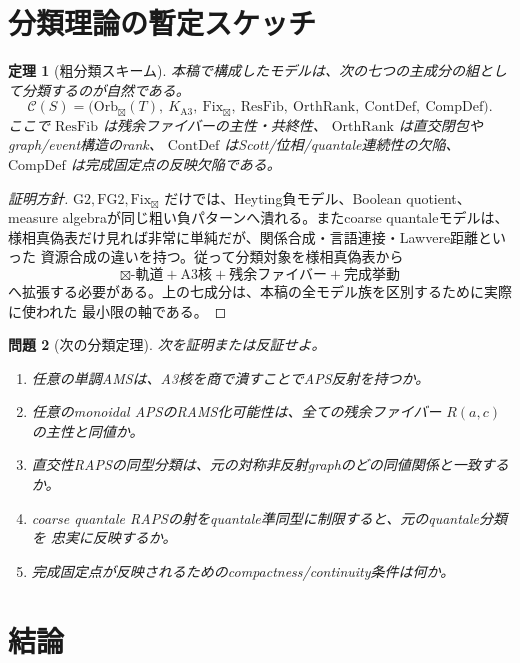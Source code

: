 \documentclass[uplatex,dvipdfmx,a4paper,10pt]{jsarticle}
\newtheorem{theorem}{定理}
\newtheorem{problem}[theorem]{問題}
\newcommand{\Gtwo}{\mathrm{G2}}
\newcommand{\FGtwo}{\mathrm{FG2}}
\newcommand{\Fix}{\mathrm{Fix}}
\newcommand{\bt}{\boxtimes}
\begin{document}
\section{分類理論の暫定スケッチ}

\begin{theorem}[粗分類スキーム]
本稿で構成したモデルは、次の七つの主成分の組として分類するのが自然である。
\[
\mathcal C(S)=
\bigl(
\mathrm{Orb}_{\bt}(T),\
K_{\mathrm{A3}},\
\Fix_{\bt},\
\mathrm{ResFib},\
\mathrm{OrthRank},\
\mathrm{ContDef},\
\mathrm{CompDef}
\bigr).
\]
ここで \(\mathrm{ResFib}\) は残余ファイバーの主性・共終性、
\(\mathrm{OrthRank}\) は直交閉包やgraph/event構造のrank、
\(\mathrm{ContDef}\) はScott/位相/quantale連続性の欠陥、
\(\mathrm{CompDef}\) は完成固定点の反映欠陥である。
\end{theorem}

\begin{proof}[証明方針]
\(\Gtwo,\FGtwo,\Fix_{\bt}\) だけでは、Heyting負モデル、Boolean quotient、
measure algebraが同じ粗い負パターンへ潰れる。またcoarse quantaleモデルは、
様相真偽表だけ見れば非常に単純だが、関係合成・言語連接・Lawvere距離といった
資源合成の違いを持つ。従って分類対象を様相真偽表から
\[
\bt\text{-軌道}+\text{A3核}+\text{残余ファイバー}+\text{完成挙動}
\]
へ拡張する必要がある。上の七成分は、本稿の全モデル族を区別するために実際に使われた
最小限の軸である。
\end{proof}

\begin{problem}[次の分類定理]
次を証明または反証せよ。
\begin{enumerate}
  \item 任意の単調AMSは、A3核を商で潰すことでAPS反射を持つか。
  \item 任意のmonoidal APSのRAMS化可能性は、全ての残余ファイバー
  \(R(a,c)\) の主性と同値か。
  \item 直交性RAPSの同型分類は、元の対称非反射graphのどの同値関係と一致するか。
  \item coarse quantale RAPSの射をquantale準同型に制限すると、元のquantale分類を
  忠実に反映するか。
  \item 完成固定点が反映されるためのcompactness/continuity条件は何か。
\end{enumerate}
\end{problem}

\section{結論}
\end{document}
